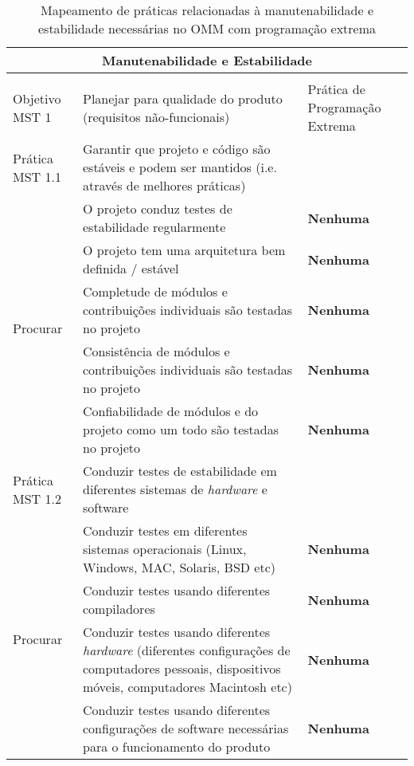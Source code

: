 \begin{longtable}{|p{2cm}|p{7cm}|p{7cm}|}
  \caption{Mapeamento de práticas relacionadas à manutenabilidade e
    estabilidade necessárias no OMM com programação extrema} \\
  \multicolumn{3}{|c|}{\cellcolor[gray]{0.6} Manutenabilidade e
    Estabilidade}\\
    \endhead
    & & \\
    \hline \cellcolor[gray]{0.6} Objetivo MST 1 &
    \cellcolor[gray]{0.6} Planejar para qualidade do produto
    (requisitos não-funcionais) &
    Prática de Programação Extrema \\
    \hline \cellcolor[gray]{0.9} Prática MST 1.1 &
    \cellcolor[gray]{0.9} Garantir que projeto e código são estáveis e
    podem ser mantidos (i.e. através de melhores práticas) &
    \\
    \hline \multirow{5}{*}{Procurar} & O projeto conduz testes de
    estabilidade regularmente &\textbf{Nenhuma} \\
    \cline{2-3} & O projeto tem uma arquitetura bem definida / estável
    &\textbf{Nenhuma} \\
    \cline{2-3} & Completude de módulos e contribuições individuais
    são
    testadas no projeto &\textbf{Nenhuma} \\
    \cline{2-3} & Consistência de módulos e contribuições individuais
    são testadas no projeto &\textbf{Nenhuma} \\
    \cline{2-3} & Confiabilidade de módulos e do projeto como um todo
    são testadas no projeto &\textbf{Nenhuma} \\
    \hline \cellcolor[gray]{0.9} Prática MST 1.2 &
    \cellcolor[gray]{0.9} Conduzir testes de estabilidade em
    diferentes sistemas de \textit{hardware} e
    software & \\
    \hline \multirow{5}{*}{Procurar} & Conduzir testes em diferentes
    sistemas operacionais (Linux, Windows, MAC, Solaris, BSD etc) &
    \textbf{Nenhuma} \\
    \cline{2-3} & Conduzir testes usando diferentes compiladores
    &\textbf{Nenhuma} \\
    \cline{2-3} & Conduzir testes usando diferentes \textit{hardware}
    (diferentes configurações de computadores pessoais, dispositivos
    móveis, computadores Macintosh etc) &\textbf{Nenhuma} \\
    \cline{2-3} & Conduzir testes usando diferentes configurações de
    software necessárias para o funcionamento do produto
    &\textbf{Nenhuma} \\

\end{longtable}
